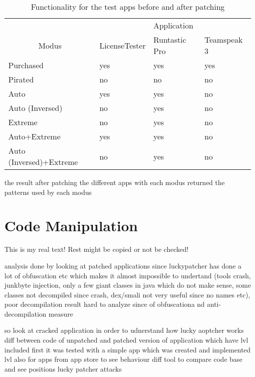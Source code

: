 \begin{table}[h]
\centering
\begin{tabular}{llll}
                                             & \multicolumn{3}{c}{Application}             \\
\multicolumn{1}{c|}{Modus}                   & LicenseTester & Runtastic Pro & Teamspeak 3 \\ \hline
\multicolumn{1}{l|}{Purchased}               & yes           & yes           & yes         \\
\multicolumn{1}{l|}{Pirated}                 & no            & no            & no          \\
\multicolumn{1}{l|}{Auto}                    & yes           & yes           & no          \\
\multicolumn{1}{l|}{Auto (Inversed)}         & no            & yes           & no          \\
\multicolumn{1}{l|}{Extreme}                 & no            & yes           & no          \\
\multicolumn{1}{l|}{Auto+Extreme}            & yes           & yes           & no          \\
\multicolumn{1}{l|}{Auto (Inversed)+Extreme} & no            & yes           & no
\end{tabular}
\caption{Functionality for the test apps before and after patching}
\label{table:functionality}
\end{table}

the result after patching the different apps with each modus returned the patterns used by each modus


\section{Code Manipulation} \label{section:luckypatcher-operation}
This is my real text! Rest might be copied or not be checked!

%
analysis done by looking at patched applications since luckypatcher has done a lot of obfuscation etc which makes it almost impossible to undertand (tools crash, junkbyte injection, only a few giant classes in java which do not make sense, some classes not decompiled since crash, dex/smali not very useful since no names etc), poor decompilation result
hard to analyze since of obfuscationa nd anti-decompilation measure

so look at cracked application in order to udnerstand how lucky aoptcher works
diff between code of unpatched and patched version of application which have lvl included
first it was tested with a simple app which was created and implemented lvl
also for apps from app store to see behaviour
diff tool to compare code base and see positions lucky patcher attacks

